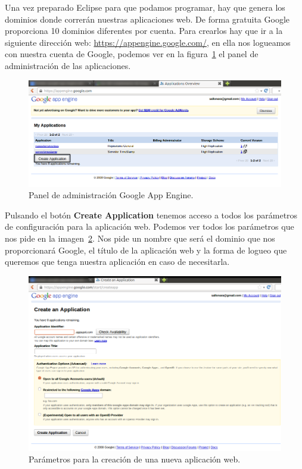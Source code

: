 Una vez preparado Eclipse para que podamos programar, hay que genera los dominios donde correrán nuestras aplicaciones web. De forma gratuita Google proporciona 10 dominios diferentes por cuenta. Para crearlos hay que ir a la siguiente dirección web: \url{https://appengine.google.com/}, en ella nos logueamos con nuestra cuenta de Google, podemos ver en la figura~\ref{fig:appEngine} el panel de administración de las aplicaciones.  

\begin{figure}
  \centering
    \includegraphics[scale=0.6]{./ConfiguracionEclipse/imagenes/appEngine.png}
  \caption{Panel de administración Google App Engine.}
  \label{fig:appEngine}
\end{figure}

Pulsando el botón \textbf{Create Application} tenemos acceso a todos los parámetros de configuración para la aplicación web. Podemos ver todos los parámetros que nos pide en la imagen~\ref{fig:createGAE}. Nos pide un nombre que será el dominio que nos proporcionará Google, el título de la aplicación web y la forma de logueo que queremos que tenga nuestra aplicación en caso de necesitarla.

\begin{figure}
  \centering
    \includegraphics[scale=0.6]{./ConfiguracionEclipse/imagenes/createGAE.png}
  \caption{Parámetros para la creación de una nueva aplicación web.}
  \label{fig:createGAE}
\end{figure}

